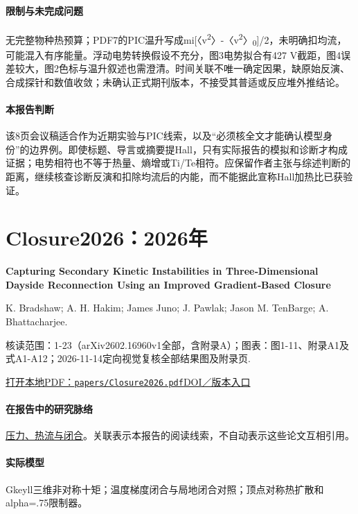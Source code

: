 \documentclass[UTF8,a4paper,11pt,openany,fontset=fandol]{ctexbook}
\begin{document}
\paragraph{限制与未完成问题}无完整物种热预算；PDF7的PIC温升写成mi[〈v\textsuperscript{2}〉-〈v\textsuperscript{2}〉\textsubscript{0}]/2，未明确扣均流，可能混入有序能量。浮动电势转换假设不充分，图3电势拟合有427 V截距，图4误差较大，图2色标与温升叙述也需澄清。时间关联不唯一确定因果，缺原始反演、合成探针和数值收敛；未确认正式期刊版本，不接受其普适或反应堆外推结论。

\paragraph{本报告判断}该8页会议稿适合作为近期实验与PIC线索，以及“必须核全文才能确认模型身份”的边界例。即使标题、导言或摘要提Hall，只有实际报告的模拟和诊断才构成证据；电势相符也不等于热量、熵增或Ti/Te相符。应保留作者主张与综述判断的距离，继续核查诊断反演和扣除均流后的内能，而不能据此宣称Hall加热比已获验证。

\section{Closure2026：2026年}\label{paper:Closure2026}

\textbf{Capturing Secondary Kinetic Instabilities in Three‐Dimensional Dayside Reconnection Using an Improved Gradient‐Based Closure}\citep{Closure2026}\

K. Bradshaw;  A. H. Hakim;  James Juno;  J. Pawlak;  Jason M. TenBarge;  A. Bhattacharjee.

\textsf{核读范围：}1-23（arXiv2602.16960v1全部，含附录A）；\textsf{图表：}图1-11、附录A1及式A1-A12；2026-11-14定向视觉复核全部结果图及附录页.

\href{run:../papers/Closure2026.pdf}{打开本地PDF：\texttt{papers/Closure2026.pdf}}\quad\href{https://doi.org/10.1029/2026ja035250}{DOI／版本入口}

\paragraph{在报告中的研究脉络}\hyperref[story:closure]{压力、热流与闭合}。关联表示本报告的阅读线索，不自动表示这些论文互相引用。

\paragraph{实际模型}Gkeyll三维非对称十矩；温度梯度闭合与局地闭合对照；顶点对称热扩散和alpha=.75限制器。
\end{document}
